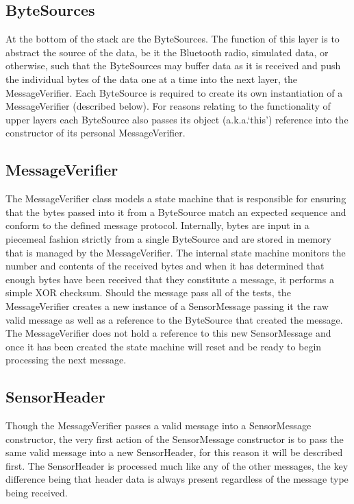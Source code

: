 \documentclass[conference,a4paper]{IEEEtran}
\begin{document}
\subsection{ByteSources}

At the bottom of the stack are the ByteSources. The function of this layer is to abstract the source of the data, be it the Bluetooth radio, simulated data, or otherwise, such that the ByteSources may buffer data as it is received and push the individual bytes of the data one at a time into the next layer, the MessageVerifier. Each ByteSource is required to create its own instantiation of a MessageVerifier (described below). For reasons relating to the functionality of upper layers each ByteSource also passes its object (a.k.a.`this') reference into the constructor of its personal MessageVerifier.

\subsection{MessageVerifier}
The MessageVerifier class models a state machine that is responsible for ensuring that the bytes passed into it from a ByteSource match an expected sequence and conform to the defined message protocol. Internally, bytes are input in a piecemeal fashion strictly from a single ByteSource and are stored in memory that is managed by the MessageVerifier. The internal state machine monitors the number and contents of the received bytes and when it has determined that enough bytes have been received that they constitute a message, it performs a simple XOR checksum. Should the message pass all of the tests, the MessageVerifier creates a new instance of a SensorMessage passing it the raw valid message as well as a reference to the ByteSource that created the message. 
The MessageVerifier does not hold a reference to this new SensorMessage and once it has been created the state machine will reset and be ready to begin processing the next message.

\subsection{SensorHeader}
Though the MessageVerifier passes a valid message into a SensorMessage constructor, the very first action of the SensorMessage constructor is to pass the same valid message into a new SensorHeader, for this reason it will be described first. The SensorHeader is processed much like any of the other messages, the key difference being that header data is always present regardless of the message type being received. 
\end{document}
